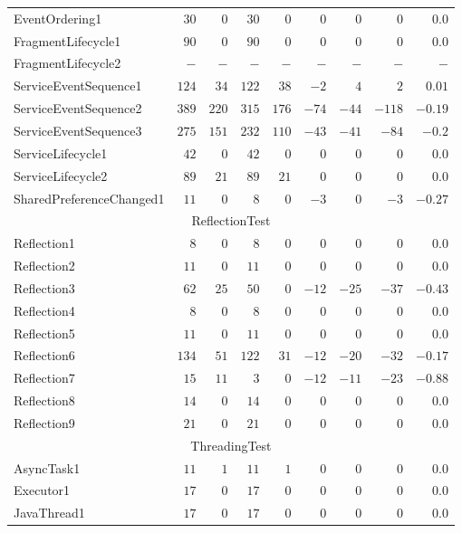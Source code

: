 \documentclass[../draft.tex]{subfiles}
\newcommand{\tsubEight}[1]{\multicolumn{9}{c}{#1}\\\hline}
\begin{document}
\begin{longtable}{l | r | r | r | r | r | r | r | r}
        EventOrdering1 & $30$ & $0$ & $30$ & $0$ & $0$ & $0$ & $0$ & $0.0$\\
        FragmentLifecycle1 & $90$ & $0$ & $90$ & $0$ & $0$ & $0$ & $0$ & $0.0$\\
        FragmentLifecycle2 & $-$ & $-$ & $-$ & $-$ & $-$ & $-$ & $-$ & $-$\\
        ServiceEventSequence1 & $124$ & $34$ & $122$ & $38$ & $-2$ & $4$ & $2$ & $0.01$\\
        ServiceEventSequence2 & $389$ & $220$ & $315$ & $176$ & $-74$ & $-44$ & $-118$ & $-0.19$\\
        ServiceEventSequence3 & $275$ & $151$ & $232$ & $110$ & $-43$ & $-41$ & $-84$ & $-0.2$\\
        ServiceLifecycle1 & $42$ & $0$ & $42$ & $0$ & $0$ & $0$ & $0$ & $0.0$\\
        ServiceLifecycle2 & $89$ & $21$ & $89$ & $21$ & $0$ & $0$ & $0$ & $0.0$\\
        SharedPreferenceChanged1 & $11$ & $0$ & $8$ & $0$ & $-3$ & $0$ & $-3$ & $-0.27$\\
        \hline
        \tsubEight{ReflectionTest}
        Reflection1 & $8$ & $0$ & $8$ & $0$ & $0$ & $0$ & $0$ & $0.0$\\
        Reflection2 & $11$ & $0$ & $11$ & $0$ & $0$ & $0$ & $0$ & $0.0$\\
        Reflection3 & $62$ & $25$ & $50$ & $0$ & $-12$ & $-25$ & $-37$ & $-0.43$\\
        Reflection4 & $8$ & $0$ & $8$ & $0$ & $0$ & $0$ & $0$ & $0.0$\\
        Reflection5 & $11$ & $0$ & $11$ & $0$ & $0$ & $0$ & $0$ & $0.0$\\
        Reflection6 & $134$ & $51$ & $122$ & $31$ & $-12$ & $-20$ & $-32$ & $-0.17$\\
        Reflection7 & $15$ & $11$ & $3$ & $0$ & $-12$ & $-11$ & $-23$ & $-0.88$\\
        Reflection8 & $14$ & $0$ & $14$ & $0$ & $0$ & $0$ & $0$ & $0.0$\\
        Reflection9 & $21$ & $0$ & $21$ & $0$ & $0$ & $0$ & $0$ & $0.0$\\
        \hline
        \tsubEight{ThreadingTest}
        AsyncTask1 & $11$ & $1$ & $11$ & $1$ & $0$ & $0$ & $0$ & $0.0$\\
        Executor1 & $17$ & $0$ & $17$ & $0$ & $0$ & $0$ & $0$ & $0.0$\\
        JavaThread1 & $17$ & $0$ & $17$ & $0$ & $0$ & $0$ & $0$ & $0.0$\\

\end{longtable}
\end{document}
